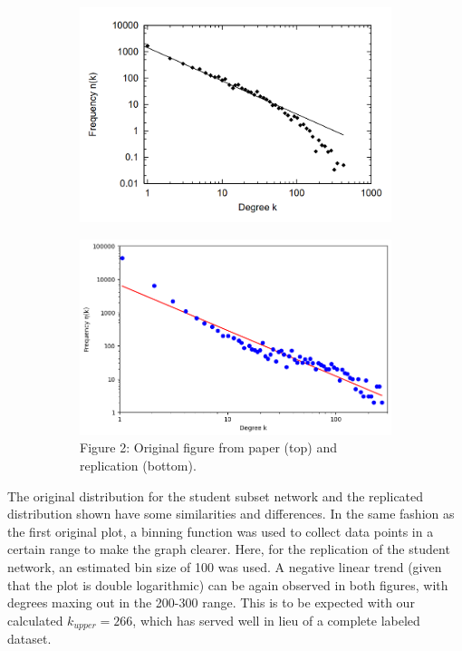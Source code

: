 \documentclass[11pt]{article}
\begin{document}
\begin{multicols}{2}
\begin{figure}[H]
  \centering
  \begin{subfigure}{0.9\linewidth}
    \centering
    \includegraphics[width=\linewidth]{figure2_original.png}
    \label{fig:figure2_original}
  \end{subfigure}
  \begin{subfigure}{0.8\linewidth}
    \centering
    \includegraphics[width=\linewidth]{figure2_replicated.png}
    \label{fig:figure2_replicated}
    \footnotesize{Figure 2: Original figure from paper (top) and replication (bottom).}
  \end{subfigure}
\end{figure}

The original distribution for the student subset network and the replicated distribution shown have some similarities and differences. In the same fashion as the first original plot, a binning function was used to collect data points in a certain range to make the graph clearer. Here, for the replication of the student network, an estimated bin size of 100 was used. A negative linear trend (given that the plot is double logarithmic) can be again observed in both figures, with degrees maxing out in the 200-300 range. This is to be expected with our calculated \(k_{upper}=266\), which has served well in lieu of a complete labeled dataset.


\end{multicols}
\end{document}
